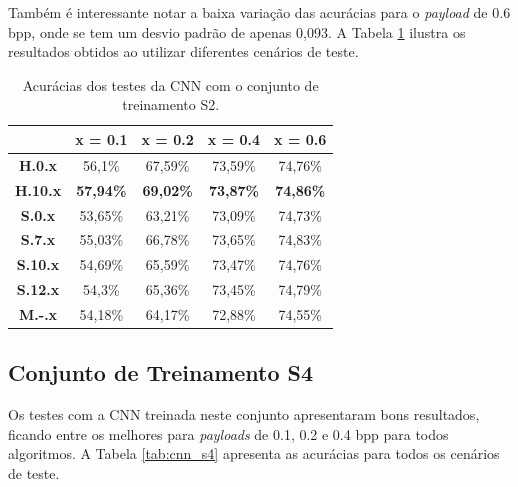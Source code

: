 Também é interessante notar a baixa variação das acurácias para o \textit{payload} de 0.6 bpp, onde se tem um desvio padrão de apenas 0,093. A Tabela \ref{tab:cnn_s2} ilustra os resultados obtidos ao utilizar diferentes cenários de teste.

\begin{table}[!ht]
\centering
\begin{tabular}{c|c|c|c|c|}
\cline{2-5}
\textbf{}                             & \textbf{x = 0.1} & \textbf{x = 0.2} & \textbf{x = 0.4} & \textbf{x = 0.6} \\ \hline
\multicolumn{1}{|c|}{\textbf{H.0.x}}  & 56,1\%           & 67,59\%          & 73,59\%          & 74,76\%          \\ \hline
\multicolumn{1}{|c|}{\textbf{H.10.x}} & \textbf{57,94\%} & \textbf{69,02\%} & \textbf{73,87\%} & \textbf{74,86\%} \\ \hline
\multicolumn{1}{|c|}{\textbf{S.0.x}}  & 53,65\%          & 63,21\%          & 73,09\%          & 74,73\%          \\ \hline
\multicolumn{1}{|c|}{\textbf{S.7.x}}  & 55,03\%          & 66,78\%          & 73,65\%          & 74,83\%          \\ \hline
\multicolumn{1}{|c|}{\textbf{S.10.x}} & 54,69\%          & 65,59\%          & 73,47\%          & 74,76\%          \\ \hline
\multicolumn{1}{|c|}{\textbf{S.12.x}} & 54,3\%           & 65,36\%          & 73,45\%          & 74,79\%          \\ \hline
\multicolumn{1}{|c|}{\textbf{M.-.x}}  & 54,18\%          & 64,17\%          & 72,88\%          & 74,55\%          \\ \hline
\end{tabular}
\caption{Acurácias dos testes da CNN com o conjunto de treinamento S2.}
\label{tab:cnn_s2}
\end{table}

\subsection{Conjunto de Treinamento S4}

Os testes com a CNN treinada neste conjunto apresentaram bons resultados, ficando entre os melhores para \textit{payloads} de 0.1, 0.2 e 0.4 bpp para todos algoritmos. A Tabela \ref{tab:cnn_s4} apresenta as acurácias para todos os cenários de teste.

